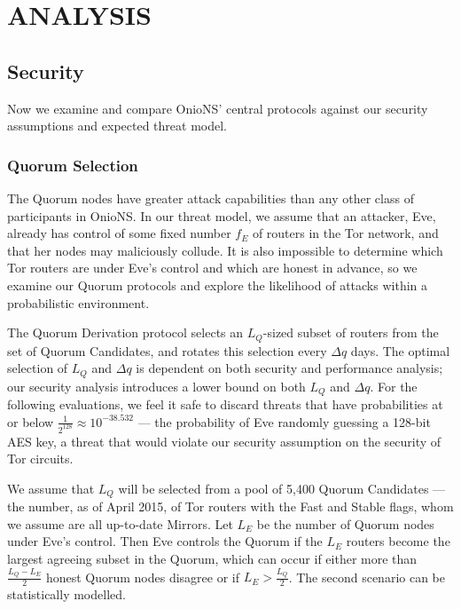 
\chapter{ANALYSIS}
\label{ch:Analysis}

\section{Security}

Now we examine and compare OnioNS' central protocols against our security assumptions and expected threat model.


\subsection{Quorum Selection}

The Quorum nodes have greater attack capabilities than any other class of participants in OnioNS. In our threat model, we assume that an attacker, Eve, already has control of some fixed number $ f_{E} $ of routers in the Tor network, and that her nodes may maliciously collude. It is also impossible to determine which Tor routers are under Eve's control and which are honest in advance, so we examine our Quorum protocols and explore the likelihood of attacks within a probabilistic environment.

The Quorum Derivation protocol selects an $ L_{Q} $-sized subset of routers from the set of Quorum Candidates, and rotates this selection every $ \Delta q $ days. The optimal selection of $ L_{Q} $ and $ \Delta q $ is dependent on both security and performance analysis; our security analysis introduces a lower bound on both $ L_{Q} $ and $ \Delta q $. For the following evaluations, we feel it safe to discard threats that have probabilities at or below $ \frac{1}{2^{128}} \approx 10^{-38.532} $ --- the probability of Eve randomly guessing a 128-bit AES key, a threat that would violate our security assumption on the security of Tor circuits.

We assume that $ L_{Q} $ will be selected from a pool of 5,400 Quorum Candidates --- the number, as of April 2015, of Tor routers with the Fast and Stable flags, whom we assume are all up-to-date Mirrors. Let $ L_{E} $ be the number of Quorum nodes under Eve's control. Then Eve controls the Quorum if the $ L_{E} $ routers become the largest agreeing subset in the Quorum, which can occur if either more than $ \frac{L_{Q} - L_{E}}{2} $ honest Quorum nodes disagree or if $ L_{E} > \frac{L_{Q}}{2} $. The second scenario can be statistically modelled.

